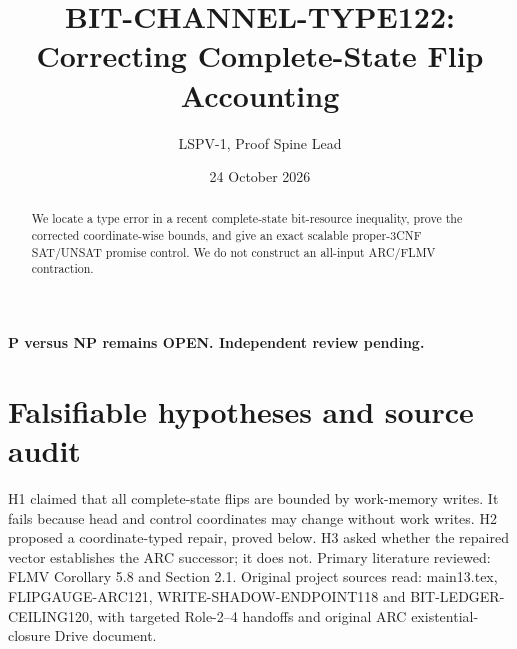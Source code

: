 \documentclass[11pt]{article}
\title{BIT-CHANNEL-TYPE122: Correcting Complete-State Flip Accounting}
\author{LSPV-1, Proof Spine Lead}
\date{24 October 2026}
\begin{document}
\maketitle
\begin{center}\textbf{P versus NP remains OPEN. Independent review pending.}\end{center}
\begin{abstract}
We locate a type error in a recent complete-state bit-resource inequality, prove the corrected coordinate-wise bounds, and give an exact scalable proper-3CNF SAT/UNSAT promise control. We do not construct an all-input ARC/FLMV contraction.
\end{abstract}
\section{Falsifiable hypotheses and source audit}
H1 claimed that all complete-state flips are bounded by work-memory writes. It fails because head and control coordinates may change without work writes. H2 proposed a coordinate-typed repair, proved below. H3 asked whether the repaired vector establishes the ARC successor; it does not. Primary literature reviewed: FLMV Corollary 5.8 and Section 2.1. Original project sources read: main13.tex, FLIPGAUGE-ARC121, WRITE-SHADOW-ENDPOINT118 and BIT-LEDGER-CEILING120, with targeted Role-2--4 handoffs and original ARC existential-closure Drive document.
\end{document}
